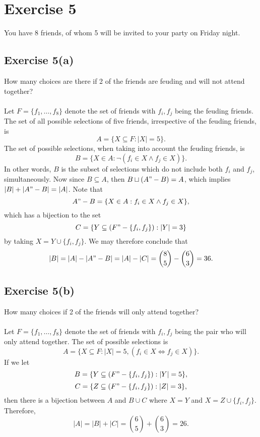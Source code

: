 \documentclass[12pt]{article}
\newenvironment{problem}
    {\begin{lrbox}{\mybox}\begin{minipage}{\textwidth-10pt}}
    {\end{minipage}\end{lrbox}\framebox[6.5in]{\usebox{\mybox}}}
\begin{document}
\section*{Exercise 5}
\begin{problem}
    You have 8 friends, of whom 5 will be invited to your party on Friday night.
\end{problem}

\subsection*{Exercise 5(a)}
\begin{problem}
    How many choices are there if 2 of the friends are feuding and will not attend together?
\end{problem}
\paragraph{}

Let $F=\{f_1,\dots,f_8\}$ denote the set of friends with $f_i,f_j$ being the feuding friends. The set of all possible selections of five friends, irrespective of the feuding friends, is
\[A = \{X\subseteq F : |X|=5\}.\]
The set of possible selections, when taking into account the feuding friends, is
\[B = \{X\in A : \lnot(f_i\in X \land f_j\in X)\}.\]
In other words, $B$ is the subset of selections which do not include both $f_i$ and $f_j$, simultaneously. Now since $B\subseteq A$, then $B\sqcup(A"-B)=A$, which implies $|B|+|A"-B| = |A|$. Note that
\[A"-B = \{X\in A : f_i\in X \land f_j\in X\},\]
which has a bijection to the set
\[C = \{Y\subseteq(F"-\{f_i,f_j\}) : |Y|=3\}\]
by taking $X = Y\cup\{f_i,f_j\}$. We may therefore conclude that
\[|B| = |A| - |A"-B| = |A|-|C| = {8\choose 5} - {6 \choose 3} = 36.\]


\subsection*{Exercise 5(b)}
\begin{problem}
    How many choices if 2 of the friends will only attend together?
\end{problem}
\paragraph{}

Let $F=\{f_1,\dots,f_8\}$ denote the set of friends with $f_i,f_j$ being the pair who will only attend together. The set of possible selections is
\[A = \{X\subseteq F : |X|=5, (f_i\in X \iff f_j\in X)\}.\]
If we let
\[B = \{Y\subseteq(F"-\{f_i,f_j\}) : |Y|=5\},\]
\[C = \{Z\subseteq(F"-\{f_i,f_j\}) : |Z|=3\},\]
then there is a bijection between $A$ and $B\cup C$ where $X=Y$ and $X=Z\cup\{f_i,f_j\}$. Therefore,
\[|A| = |B| + |C| = {6 \choose 5} + {6\choose 3} = 26.\]
\end{document}
